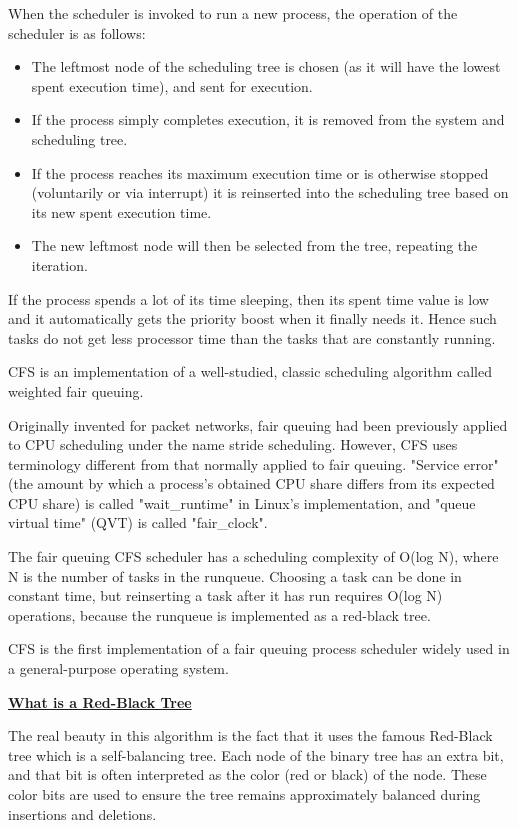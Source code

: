\documentclass{article}
\begin{document}
When the scheduler is invoked to run a new process, the operation of the scheduler is as follows:

\begin{itemize}
\item The leftmost node of the scheduling tree is chosen (as it will have the lowest spent execution time), and sent for execution.
\item If the process simply completes execution, it is removed from the system and scheduling tree.
\item If the process reaches its maximum execution time or is otherwise stopped (voluntarily or via interrupt) it is reinserted into the scheduling tree based on its new spent execution time.
\item The new leftmost node will then be selected from the tree, repeating the iteration.
\end{itemize}

If the process spends a lot of its time sleeping, then its spent time value is low and it automatically gets the priority boost when it finally needs it. Hence such tasks do not get less processor time than the tasks that are constantly running.

CFS is an implementation of a well-studied, classic scheduling algorithm called weighted fair queuing.

Originally invented for packet networks, fair queuing had been previously applied to CPU scheduling under the name stride scheduling. However, CFS uses terminology different from that normally applied to fair queuing. "Service error" (the amount by which a process's obtained CPU share differs from its expected CPU share) is called "wait\_runtime" in Linux's implementation, and "queue virtual time" (QVT) is called "fair\_clock".

The fair queuing CFS scheduler has a scheduling complexity of O(log N), where N is the number of tasks in the runqueue. Choosing a task can be done in constant time, but reinserting a task after it has run requires O(log N) operations, because the runqueue is implemented as a red-black tree.

CFS is the first implementation of a fair queuing process scheduler widely used in a general-purpose operating system.

\bigskip

\textbf{\underline{What is a Red-Black Tree}}

The real beauty in this algorithm is the fact that it uses the famous Red-Black tree which is a self-balancing tree. Each node of the binary tree has an extra bit, and that bit is often interpreted as the color (red or black) of the node. These color bits are used to ensure the tree remains approximately balanced during insertions and deletions.
\end{document}
